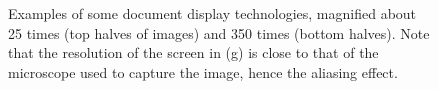 \begin{figure}
\begin{centering}
         \hspace{1mm} 
         \hspace{1mm} 

    \end{centering}

    \caption[Examples of document display technologies]{Examples of some document display technologies, magnified about 25 times (top halves of images) and 350 times (bottom halves). Note that the resolution of the screen in (g) is close to that of the microscope used to capture the image, hence the aliasing effect.}
    \label{fig:screens}
\end{figure}




